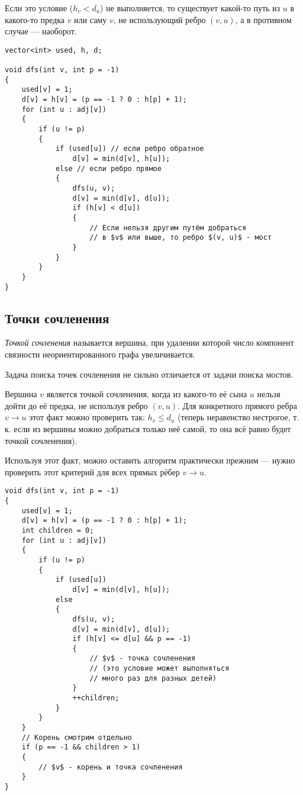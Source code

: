 Если это условие ($h_v < d_u$) не выполняется, то существует какой-то путь из $u$ в какого-то предка $v$ или саму $v$, не использующий ребро $(v, u)$, а в противном случае --- наоборот.

\begin{verbatim}
vector<int> used, h, d;

void dfs(int v, int p = -1)
{
    used[v] = 1;
    d[v] = h[v] = (p == -1 ? 0 : h[p] + 1);
    for (int u : adj[v])
    {
        if (u != p)
        {
            if (used[u]) // если ребро обратное
                d[v] = min(d[v], h[u]);
            else // если ребро прямое
            {
                dfs(u, v);
                d[v] = min(d[v], d[u]);
                if (h[v] < d[u])
                {
                    // Если нельзя другим путём добраться
                    // в $v$ или выше, то ребро $(v, u)$ - мост
                }
            }
        }
    }
}
\end{verbatim}

\subsection{Точки сочленения}

\begin{definition}
    \textit{Точкой сочленения} называется вершина, при удалении которой число компонент связности неориентированного графа увеличивается.
\end{definition}

Задача поиска точек сочленения не сильно отличается от задачи поиска мостов.

Вершина $v$ является точкой сочленения, когда из какого-то её сына $u$ нельзя дойти до её предка, не используя ребро $(v, u)$. Для конкретного прямого ребра $v \to u$ этот факт можно проверить так: $h_v \leqslant d_u$ (теперь неравенство нестрогое, т.\,к. если из вершины можно добраться только неё самой, то она всё равно будет точкой сочленения).

Используя этот факт, можно оставить алгоритм практически прежним --- нужно проверить этот критерий для всех прямых рёбер $v \to u$.

\begin{verbatim}
void dfs(int v, int p = -1)
{
    used[v] = 1;
    d[v] = h[v] = (p == -1 ? 0 : h[p] + 1);
    int children = 0;
    for (int u : adj[v])
    {
        if (u != p)
        {
            if (used[u])
                d[v] = min(d[v], h[u]);
            else
            {
                dfs(u, v);
                d[v] = min(d[v], d[u]);
                if (h[v] <= d[u] && p == -1)
                {
                    // $v$ - точка сочленения
                    // (это условие может выполняться
                    // много раз для разных детей)
                }
                ++children;
            }
        }
    }
    // Корень смотрим отдельно
    if (p == -1 && children > 1)
    {
        // $v$ - корень и точка сочленения
    }
}
\end{verbatim}

